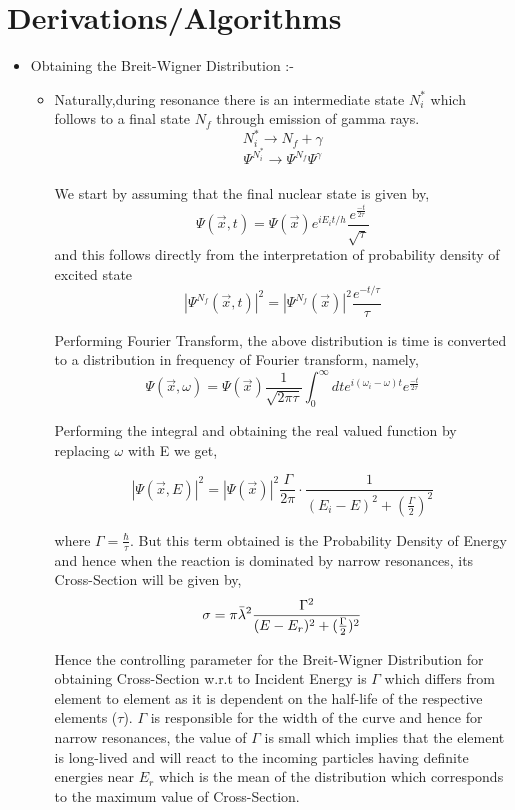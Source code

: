 \documentclass{article}
\begin{document}
\section{Derivations/Algorithms}
\begin{itemize}
    \item Obtaining the Breit-Wigner Distribution :-
    \begin{itemize}
        \item Naturally,during  resonance there is an intermediate state $N_i^*$ which follows to a final state $N_f$ through emission of gamma rays.
        $$N_i^* \xrightarrow{} N_f + \gamma$$
        $$\Psi^{N_i^*} \xrightarrow{} \Psi^{N_f}\Psi^\gamma$$\\
        We start by assuming that the final nuclear state is given by,
        $$\Psi(\vec{x}, t) = \Psi(\vec{x})e^{iE_{i}t/h}\frac{e^\frac{-t}{2 \tau}}{\sqrt{\tau}}$$
        and this follows directly from the interpretation of probability density of excited state
        $$|\Psi^{N_f}(\vec{x},t)|^2 = |\Psi^{N_f}(\vec{x})|^2 \frac{e^{-t/\tau}}{\tau}$$
        
        Performing Fourier Transform, the above distribution is time is converted to a distribution in frequency of Fourier transform, namely,
        $$\Psi(\vec{x}, \omega) = \Psi(\vec{x})\frac{1}{\sqrt{2\pi \tau}}\int_0^\infty dt e^{i(\omega_i - \omega)t}e^\frac{-t}{2\tau}$$
        
        Performing the integral and obtaining the real valued function by replacing $\omega$ with E we get,
        
        $$|\Psi(\vec{x}, E)|^2 = |\Psi(\vec{x})|^2 \frac{\Gamma}{2\pi}\cdot\frac{1}{(E_i - E)^2 + (\frac{\Gamma}{2})^2}$$
        
        where $\Gamma = \frac{\hbar}{\tau}$. But this term obtained is the Probability Density of Energy and hence when the reaction is dominated by narrow resonances, its Cross-Section will be given by,
        $$\sigma = \pi \Bar{\lambda}^2 \frac{\Gamma^2}{(E - E_r)^2 + (\frac{\Gamma}{2})^2}$$
        
        Hence the controlling parameter for the Breit-Wigner Distribution for obtaining Cross-Section w.r.t to Incident Energy is $\Gamma$ which differs from element to element as it is dependent on the half-life of the respective elements ($\tau$). $\Gamma$ is responsible for the width of the curve and hence for narrow resonances, the value of $\Gamma$ is small which implies that the element is long-lived and will react to the incoming particles having definite energies near $E_r$ which is the mean of the distribution which corresponds to the maximum value of Cross-Section.
        
         
    \end{itemize}
\end{itemize}
\end{document}
